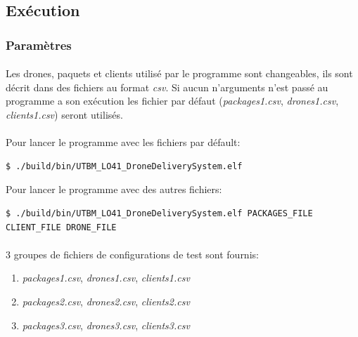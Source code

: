 \documentclass[article, backcover, french, nodocumentinfo]{upmethodology-document}
\begin{document}
		\subsection{Exécution}
			\subsubsection{Paramètres}
				\paragraph*{}
					Les drones, paquets et clients utilisé par le programme sont changeables, ils sont décrit dans des fichiers au format \textit{csv}. Si aucun n'arguments n'est passé au programme a son exécution les fichier par défaut (\textit{packages1.csv}, \textit{drones1.csv}, \textit{clients1.csv}) seront utilisés.
				\paragraph*{}
					Pour lancer le programme avec les fichiers par défault:
					\begin{lstlisting}[breaklines=true,breakatwhitespace=true,breakindent=0pt,columns=fixed,keepspaces=true,frame=single,basicstyle=\footnotesize\sffamily]
$ ./build/bin/UTBM_LO41_DroneDeliverySystem.elf\end{lstlisting}
					Pour lancer le programme avec des autres fichiers:
					\begin{lstlisting}[breaklines=true,breakatwhitespace=true,breakindent=0pt,columns=fixed,keepspaces=true,frame=single,basicstyle=\footnotesize\sffamily]
$ ./build/bin/UTBM_LO41_DroneDeliverySystem.elf PACKAGES_FILE CLIENT_FILE DRONE_FILE\end{lstlisting}
				\paragraph*{}
					3 groupes de fichiers de configurations de test sont fournis:
					\begin{enumerate}
						\item \textit{packages1.csv}, \textit{drones1.csv}, \textit{clients1.csv}
						\item \textit{packages2.csv}, \textit{drones2.csv}, \textit{clients2.csv}
						\item \textit{packages3.csv}, \textit{drones3.csv}, \textit{clients3.csv}
					\end{enumerate}
\end{document}
